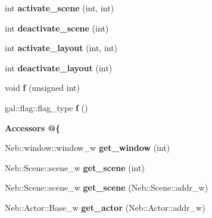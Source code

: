 \begin{DoxyCompactItemize}
\item 
\hypertarget{classNeb_1_1app_aa558ff3c281cd6f6b7bdca7f5a7807ff}{int {\bfseries activate\-\_\-scene} (int, int)}\label{classNeb_1_1app_aa558ff3c281cd6f6b7bdca7f5a7807ff}

\item 
\hypertarget{classNeb_1_1app_a5b1a2bc9d50490f9fce6edf33a910ad5}{int {\bfseries deactivate\-\_\-scene} (int)}\label{classNeb_1_1app_a5b1a2bc9d50490f9fce6edf33a910ad5}

\item 
\hypertarget{classNeb_1_1app_a421f2d98f0857f6d73824740019c94f1}{int {\bfseries activate\-\_\-layout} (int, int)}\label{classNeb_1_1app_a421f2d98f0857f6d73824740019c94f1}

\item 
\hypertarget{classNeb_1_1app_a81e36552d5b9bd439237b8ca7950f82b}{int {\bfseries deactivate\-\_\-layout} (int)}\label{classNeb_1_1app_a81e36552d5b9bd439237b8ca7950f82b}

\item 
\hypertarget{classNeb_1_1app_a373ce82cfb06b21444d90daeaa0900a5}{void {\bfseries f} (unsigned int)}\label{classNeb_1_1app_a373ce82cfb06b21444d90daeaa0900a5}

\item 
\hypertarget{classNeb_1_1app_a4158adddede1a017c151da072503dcad}{gal\-::flag\-::flag\-\_\-type {\bfseries f} ()}\label{classNeb_1_1app_a4158adddede1a017c151da072503dcad}

\end{DoxyCompactItemize}
\begin{Indent}{\bf \-Accessors @\{}\par
\begin{DoxyCompactItemize}
\item 
\hypertarget{classNeb_1_1app_a9e1237d528a0bfd338526751bff4a60d}{\-Neb\-::window\-::window\-\_\-w {\bfseries get\-\_\-window} (int)}\label{classNeb_1_1app_a9e1237d528a0bfd338526751bff4a60d}

\item 
\hypertarget{classNeb_1_1app_af34dfea535edde96fc5e5dfb67c37505}{\-Neb\-::\-Scene\-::scene\-\_\-w {\bfseries get\-\_\-scene} (int)}\label{classNeb_1_1app_af34dfea535edde96fc5e5dfb67c37505}

\item 
\hypertarget{classNeb_1_1app_ae37a92e33de6acf1fd0c338300862ca8}{\-Neb\-::\-Scene\-::scene\-\_\-w {\bfseries get\-\_\-scene} (\-Neb\-::\-Scene\-::addr\-\_\-w)}\label{classNeb_1_1app_ae37a92e33de6acf1fd0c338300862ca8}

\item 
\hypertarget{classNeb_1_1app_a22284f20ae70f616792bceef3fa15bfe}{\-Neb\-::\-Actor\-::\-Base\-\_\-w {\bfseries get\-\_\-actor} (\-Neb\-::\-Actor\-::addr\-\_\-w)}\label{classNeb_1_1app_a22284f20ae70f616792bceef3fa15bfe}

\end{DoxyCompactItemize}
\end{Indent}
